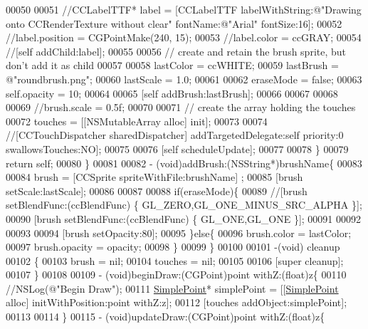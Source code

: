 \begin{DoxyCode}
00050 
00051         \textcolor{comment}{//CCLabelTTF* label = [CCLabelTTF labelWithString:@"Drawing onto CCRenderTexture without clear"
       fontName:@"Arial" fontSize:16];}
00052         \textcolor{comment}{//label.position = CGPointMake(240, 15);}
00053         \textcolor{comment}{//label.color = ccGRAY;}
00054         \textcolor{comment}{//[self addChild:label];}
00055 
00056         \textcolor{comment}{// create and retain the brush sprite, but don't add it as child}
00057         
00058         lastColor = ccWHITE;
00059         lastBrush = \textcolor{stringliteral}{@"roundbrush.png"};
00060         lastScale = 1.0;
00061         
00062         eraseMode = \textcolor{keyword}{false};
00063         \textcolor{keyword}{self}.opacity = 10;
00064         
00065         [\textcolor{keyword}{self} addBrush:lastBrush];
00066         
00067     
00068         
00069         \textcolor{comment}{//brush.scale = 0.5f;}
00070 
00071         \textcolor{comment}{// create the array holding the touches}
00072         touches = [[NSMutableArray alloc] init];
00073         
00074         \textcolor{comment}{//[CCTouchDispatcher sharedDispatcher] addTargetedDelegate:self priority:0 swallowsTouches:NO];}
00075         
00076         [\textcolor{keyword}{self} scheduleUpdate];
00077 
00078     \}
00079     \textcolor{keywordflow}{return} \textcolor{keyword}{self};
00080 \}
00081 
00082 - (void)addBrush:(NSString*)brushName\{
00083     
00084     brush = [CCSprite spriteWithFile:brushName] ;
00085     [brush setScale:lastScale];
00086     
00087     
00088     \textcolor{keywordflow}{if}(eraseMode)\{
00089         \textcolor{comment}{//[brush setBlendFunc:(ccBlendFunc) \{ GL\_ZERO,GL\_ONE\_MINUS\_SRC\_ALPHA \}];}
00090         [brush setBlendFunc:(ccBlendFunc) \{ GL\_ONE,GL\_ONE \}];
00091         
00092         
00093 
00094         [brush setOpacity:80];
00095     \}\textcolor{keywordflow}{else}\{
00096         brush.color = lastColor;
00097         brush.opacity = opacity;
00098     \}
00099 \}
00100 
00101 -(void) cleanup
00102 \{
00103     brush = nil;
00104     touches = nil;
00105     
00106     [\textcolor{keyword}{super} cleanup];
00107 \}
00108 
00109 - (void)beginDraw:(CGPoint)point withZ:(\textcolor{keywordtype}{float})z\{
00110     \textcolor{comment}{//NSLog(@"Begin Draw");}
00111     \hyperlink{interface_simple_point}{SimplePoint}* simplePoint = [[\hyperlink{interface_simple_point}{SimplePoint} alloc] initWithPosition:point withZ:z];
00112     [touches addObject:simplePoint];
00113     
00114 \}
00115 - (void)updateDraw:(CGPoint)point withZ:(\textcolor{keywordtype}{float})z\{

\end{DoxyCode}

